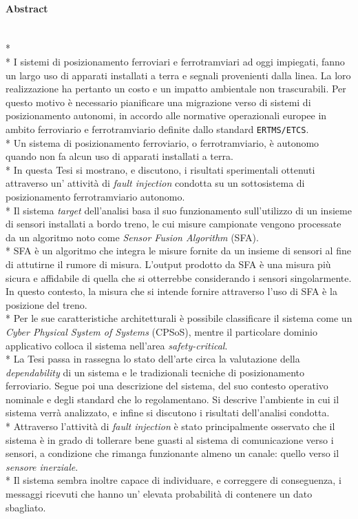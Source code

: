 \paragraph{Abstract}\mbox{}\\*\\*
I sistemi di posizionamento ferroviari e ferrotramviari ad oggi impiegati, fanno un largo uso di apparati installati a terra e segnali provenienti dalla linea. La loro realizzazione ha pertanto un costo e un impatto ambientale non trascurabili. Per questo motivo \`e necessario pianificare una migrazione verso di sistemi di posizionamento autonomi, in accordo alle normative operazionali europee in ambito ferroviario e ferrotramviario definite dallo standard \texttt{ERTMS/ETCS}.\\*
Un sistema di posizionamento ferroviario, o ferrotramviario, \`e autonomo quando non fa alcun uso di apparati installati a terra.\\*
In questa Tesi si mostrano, e discutono, i risultati sperimentali ottenuti attraverso un' attivit\`a di \emph{fault injection} condotta su un sottosistema di posizionamento ferrotramviario autonomo.\\*
Il sistema \emph{target} dell'analisi basa il suo funzionamento sull'utilizzo di un insieme di sensori installati a bordo treno, le cui misure campionate vengono processate da un algoritmo noto come \emph{Sensor Fusion Algorithm} (SFA).\\*
SFA \`e un algoritmo che integra le misure fornite da un insieme di sensori al fine di attutirne il rumore di misura. L'output prodotto da SFA \`e una misura pi\`u sicura e affidabile di quella che si otterrebbe considerando i sensori singolarmente. In questo contesto, la misura che si intende fornire attraverso l'uso di SFA \`e la posizione del treno.\\*
Per le sue caratteristiche architetturali \`e possibile classificare il sistema come un \emph{Cyber Physical System of Systems} (CPSoS), mentre il particolare dominio applicativo colloca il sistema nell'area \emph{safety-critical}.\\*
La Tesi passa in rassegna lo stato dell'arte circa la valutazione della \emph{dependability} di un sistema e le tradizionali tecniche di posizionamento ferroviario. Segue poi una descrizione del sistema, del suo contesto operativo nominale e degli standard che lo regolamentano. Si descrive l'ambiente in cui il sistema verr\`a analizzato, e infine si discutono i risultati dell'analisi condotta.\\*
Attraverso l'attivit\`a di \emph{fault injection} \`e stato principalmente osservato che il sistema \`e in grado di tollerare bene guasti al sistema di comunicazione verso i sensori, a condizione che rimanga funzionante almeno un canale: quello verso il \emph{sensore inerziale}.\\*
Il sistema sembra inoltre capace di individuare, e correggere di conseguenza, i messaggi ricevuti che hanno un' elevata probabilit\`a di contenere un dato sbagliato.
